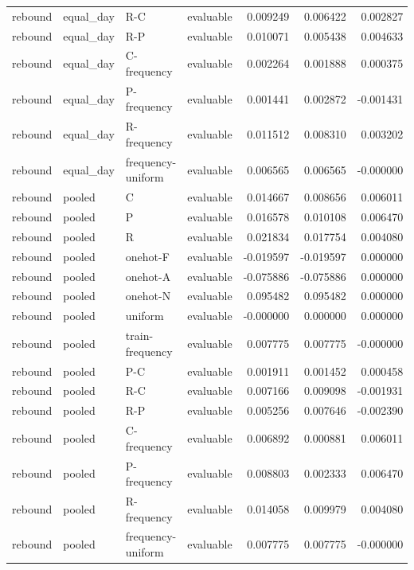 \begin{longtable}{llllrrr}
rebound & equal\_day & R-C & evaluable & 0.009249 & 0.006422 & 0.002827 \\
rebound & equal\_day & R-P & evaluable & 0.010071 & 0.005438 & 0.004633 \\
rebound & equal\_day & C-frequency & evaluable & 0.002264 & 0.001888 & 0.000375 \\
rebound & equal\_day & P-frequency & evaluable & 0.001441 & 0.002872 & -0.001431 \\
rebound & equal\_day & R-frequency & evaluable & 0.011512 & 0.008310 & 0.003202 \\
rebound & equal\_day & frequency-uniform & evaluable & 0.006565 & 0.006565 & -0.000000 \\
rebound & pooled & C & evaluable & 0.014667 & 0.008656 & 0.006011 \\
rebound & pooled & P & evaluable & 0.016578 & 0.010108 & 0.006470 \\
rebound & pooled & R & evaluable & 0.021834 & 0.017754 & 0.004080 \\
rebound & pooled & onehot-F & evaluable & -0.019597 & -0.019597 & 0.000000 \\
rebound & pooled & onehot-A & evaluable & -0.075886 & -0.075886 & 0.000000 \\
rebound & pooled & onehot-N & evaluable & 0.095482 & 0.095482 & 0.000000 \\
rebound & pooled & uniform & evaluable & -0.000000 & 0.000000 & 0.000000 \\
rebound & pooled & train-frequency & evaluable & 0.007775 & 0.007775 & -0.000000 \\
rebound & pooled & P-C & evaluable & 0.001911 & 0.001452 & 0.000458 \\
rebound & pooled & R-C & evaluable & 0.007166 & 0.009098 & -0.001931 \\
rebound & pooled & R-P & evaluable & 0.005256 & 0.007646 & -0.002390 \\
rebound & pooled & C-frequency & evaluable & 0.006892 & 0.000881 & 0.006011 \\
rebound & pooled & P-frequency & evaluable & 0.008803 & 0.002333 & 0.006470 \\
rebound & pooled & R-frequency & evaluable & 0.014058 & 0.009979 & 0.004080 \\
rebound & pooled & frequency-uniform & evaluable & 0.007775 & 0.007775 & -0.000000 \\
\end{longtable}
